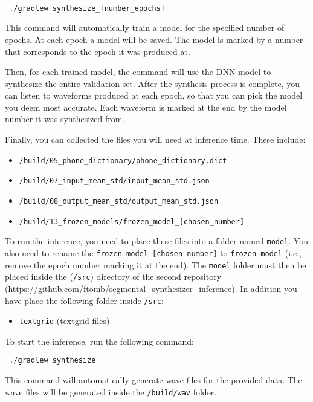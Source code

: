 \begin{verbatim}

 ./gradlew synthesize_[number_epochs]

\end{verbatim}

This command will automatically train a model for the specified number of epochs.
At each epoch a model will be saved.
The model is marked by a number that corresponds to the epoch it was produced at.

Then, for each trained model, the command will use the \ac{DNN} model to synthesize the entire validation set.
After the synthesis process is complete, you can listen to waveforms produced at each epoch, so that you can pick the model you deem most accurate.
Each waveform is marked at the end by the model number it was synthesized from.

Finally, you can collected the files you will need at inference time.
These include:

\begin{itemize}[noitemsep]
    \item \verb|/build/05_phone_dictionary/phone_dictionary.dict|
    \item \verb|/build/07_input_mean_std/input_mean_std.json| 
    \item \verb|/build/08_output_mean_std/output_mean_std.json|
    \item \verb|/build/13_frozen_models/frozen_model_[chosen_number]|
\end{itemize}

To run the inference, you need to place these files into a folder named \verb|model|.
You also need to rename the \verb|frozen_model_[chosen_number]| to \verb|frozen_model| (i.e., remove the epoch number marking it at the end).
The \verb|model| folder must then be placed inside the (\verb|/src|) directory of the second repository (\url{https://github.com/ftomb/segmental_synthesizer_inference}).
In addition you have place the following folder inside \verb|/src|:

\begin{itemize}[noitemsep]
    \item \verb|textgrid| (textgrid files)
\end{itemize}

To start the inference, run the following command:

\begin{verbatim}
 ./gradlew synthesize
\end{verbatim}

This command will automatically generate wave files for the provided data.
The wave files will be generated inside the \verb|/build/wav| folder.


